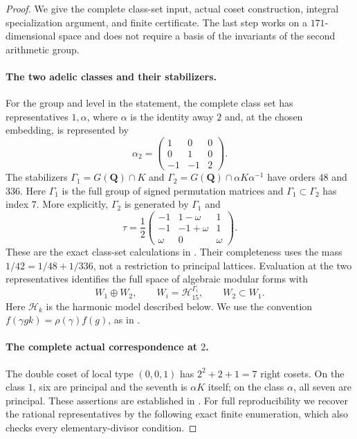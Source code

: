 \documentclass[11pt,a4paper]{article}
\theoremstyle{definition}
\begin{document}
\begin{proof}
We give the complete class-set input, actual coset construction,
integral specialization argument, and finite certificate. The last
step works on a $171$-dimensional space and does not require a basis
of the invariants of the second arithmetic group.

\paragraph{The two adelic classes and their stabilizers.}
For the group and level in the statement, the complete class set has
representatives $1,\alpha$, where $\alpha$ is the identity away $2$
and, at the chosen embedding, is represented by
\[
 \alpha_2=\begin{pmatrix}1&0&0\\0&1&0\\-1&-1&2\end{pmatrix}.
 \tag{U7.3}
\]
The stabilizers
$\Gamma_1=G(\mathbf Q)\cap K$ and
$\Gamma_2=G(\mathbf Q)\cap\alpha K\alpha^{-1}$ have orders
$48$ and $336$. Here $\Gamma_1$ is the full group of signed
permutation matrices and $\Gamma_1\subset\Gamma_2$ has index $7$.
More explicitly, $\Gamma_2$ is generated by $\Gamma_1$ and
\[
 \tau=\frac12
 \begin{pmatrix}-1&1-\omega&1\\-1&-1+\omega&1\\
                 \omega&0&\omega\end{pmatrix}.
 \tag{U7.4}
\]
These are the exact class-set calculations in
\cite[\S3, printed pp.~6--7]{K17Loeffler2008}. Their completeness
uses the mass $1/42=1/48+1/336$, not a restriction to principal
lattices. Evaluation at the two representatives identifies the full
space of algebraic modular forms with
\[
 W_1\oplus W_2,
 \qquad W_i=\mathcal H_{15}^{\Gamma_i},
 \qquad W_2\subset W_1.
 \tag{U7.5}
\]
Here $\mathcal H_k$ is the harmonic model described below. We use
the convention $f(\gamma gk)=\rho(\gamma)f(g)$, as in
\cite[\S\S2.1--2.2, printed pp.~3--4]{K17Loeffler2008}.

\paragraph{The complete actual correspondence at $2$.}
The double coset of local type $(0,0,1)$ has $2^2+2+1=7$ right
cosets. On the class $1$, six are principal and the seventh is
$\alpha K$ itself; on the class $\alpha$, all seven are principal.
These assertions are established in
\cite[Lemma~2.5 and \S3, printed pp.~5--7]{K17Loeffler2008}.
For full reproducibility we recover the rational representatives by
the following exact finite enumeration, which also checks every
elementary-divisor condition.


\end{proof}
\end{document}
